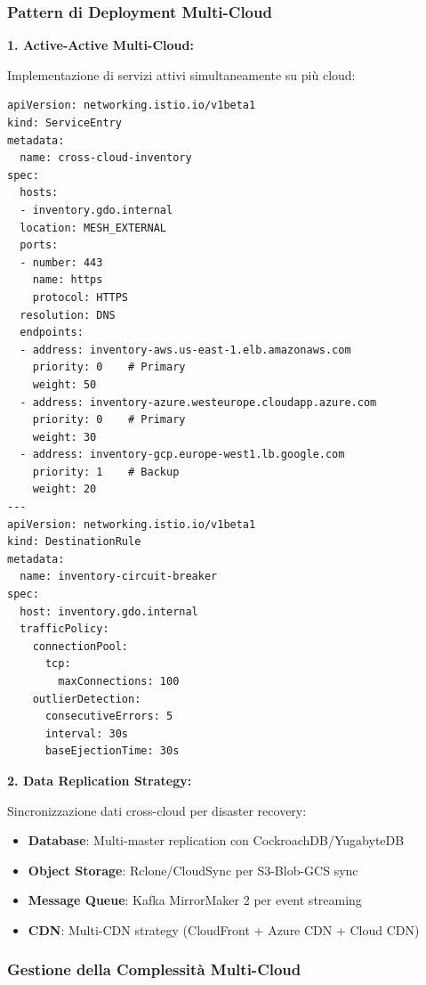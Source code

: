 \subsubsection{\texorpdfstring{\textbf{Pattern di Deployment Multi-Cloud}}{3.4.2.2 - Pattern di Deployment Multi-Cloud}}

\textbf{1. Active-Active Multi-Cloud:}

Implementazione di servizi attivi simultaneamente su più cloud:

\begin{lstlisting}[caption={Kubernetes Multi-Cloud Service},label={lst:multicloud_k8s}]
apiVersion: networking.istio.io/v1beta1
kind: ServiceEntry
metadata:
  name: cross-cloud-inventory
spec:
  hosts:
  - inventory.gdo.internal
  location: MESH_EXTERNAL
  ports:
  - number: 443
    name: https
    protocol: HTTPS
  resolution: DNS
  endpoints:
  - address: inventory-aws.us-east-1.elb.amazonaws.com
    priority: 0    # Primary
    weight: 50
  - address: inventory-azure.westeurope.cloudapp.azure.com
    priority: 0    # Primary
    weight: 30
  - address: inventory-gcp.europe-west1.lb.google.com
    priority: 1    # Backup
    weight: 20
---
apiVersion: networking.istio.io/v1beta1
kind: DestinationRule
metadata:
  name: inventory-circuit-breaker
spec:
  host: inventory.gdo.internal
  trafficPolicy:
    connectionPool:
      tcp:
        maxConnections: 100
    outlierDetection:
      consecutiveErrors: 5
      interval: 30s
      baseEjectionTime: 30s
\end{lstlisting}

\textbf{2. Data Replication Strategy:}

Sincronizzazione dati cross-cloud per disaster recovery:

\begin{itemize}
    \item \textbf{Database}: Multi-master replication con CockroachDB/YugabyteDB
    \item \textbf{Object Storage}: Rclone/CloudSync per S3-Blob-GCS sync
    \item \textbf{Message Queue}: Kafka MirrorMaker 2 per event streaming
    \item \textbf{CDN}: Multi-CDN strategy (CloudFront + Azure CDN + Cloud CDN)
\end{itemize}

\subsubsection{\texorpdfstring{\textbf{Gestione della Complessità Multi-Cloud}}{3.4.2.3 - Gestione della Complessità Multi-Cloud}}

